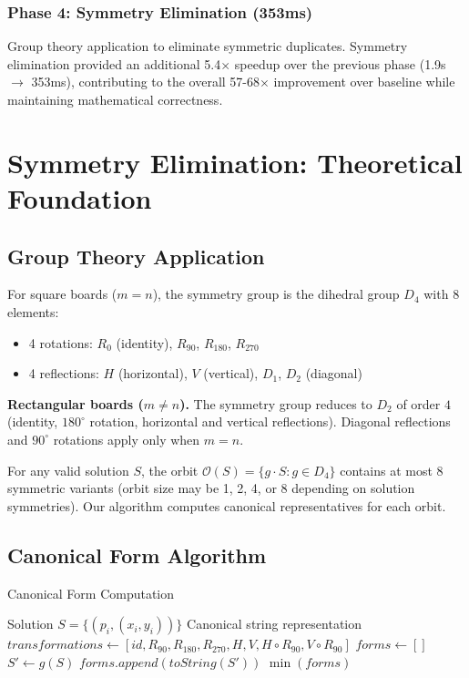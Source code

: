 \documentclass[12pt,a4paper]{article}
\theoremstyle{definition}
\begin{document}
\subsubsection{Phase 4: Symmetry Elimination (353ms)}
Group theory application to eliminate symmetric duplicates. Symmetry elimination provided an additional 5.4$\times$ speedup over the previous phase (1.9s $\rightarrow$ 353ms), contributing to the overall 57-68$\times$ improvement over baseline while maintaining mathematical correctness.

\section{Symmetry Elimination: Theoretical Foundation}

\subsection{Group Theory Application}

For square boards ($m = n$), the symmetry group is the dihedral group $D_4$ with 8 elements:
\begin{itemize}
\item 4 rotations: $R_0$ (identity), $R_{90}$, $R_{180}$, $R_{270}$
\item 4 reflections: $H$ (horizontal), $V$ (vertical), $D_1$, $D_2$ (diagonal)
\end{itemize}

\textbf{Rectangular boards ($m \neq n$).} The symmetry group reduces to $D_2$ of order $4$ (identity, $180^\circ$ rotation, horizontal and vertical reflections). Diagonal reflections and $90^\circ$ rotations apply only when $m=n$.

For any valid solution $S$, the orbit $\mathcal{O}(S) = \{g \cdot S : g \in D_4\}$ contains at most 8 symmetric variants (orbit size may be 1, 2, 4, or 8 depending on solution symmetries). Our algorithm computes canonical representatives for each orbit.

\subsection{Canonical Form Algorithm}

\begin{algorithm}
\caption{Canonical Form Computation}
\begin{algorithmic}[1]
\REQUIRE Solution $S = \{(p_i, (x_i, y_i))\}$
\ENSURE Canonical string representation
\STATE $transformations \leftarrow [id, R_{90}, R_{180}, R_{270}, H, V, H \circ R_{90}, V \circ R_{90}]$
\STATE $forms \leftarrow []$
    \STATE $S' \leftarrow g(S)$
    \STATE $forms.append(toString(S'))$
\ENDFOR
\RETURN $\min(forms)$ 
\end{algorithmic}
\end{algorithm}
\end{document}
